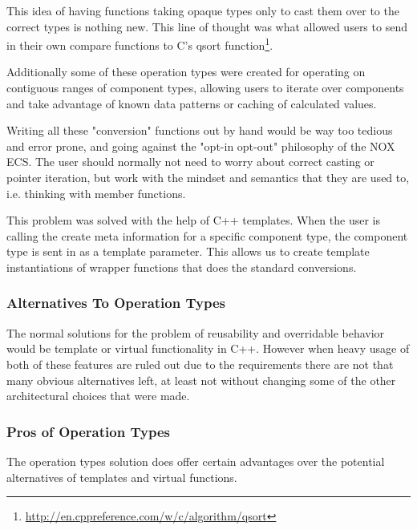 This idea of having functions taking opaque types only to cast them over to the correct types is nothing new.
This line of thought was what allowed users to send in their own compare functions to C's qsort function\footnote{\url{http://en.cppreference.com/w/c/algorithm/qsort}}.

Additionally some of these operation types were created for operating on contiguous ranges of component types,
allowing users to iterate over components and take advantage of known data patterns or caching of calculated values.

Writing all these "conversion" functions out by hand would be way too tedious and error prone,
and going against the "opt-in opt-out" philosophy of the NOX ECS.
The user should normally not need to worry about correct casting or pointer iteration,
but work with the mindset and semantics that they are used to, i.e. thinking with member functions.

This problem was solved with the help of C++ templates. 
When the user is calling the create meta information for a specific component type,
the component type is sent in as a template parameter.
This allows us to create template instantiations of wrapper functions that does the standard conversions.

\subsubsection{Alternatives To Operation Types}
The normal solutions for the problem of reusability and overridable behavior would be template or virtual
functionality in C++. However when heavy usage of both of these features are ruled out due to the requirements there are not that many obvious alternatives left,
at least not without changing some of the other architectural choices that were made.

\subsubsection{Pros of Operation Types}
The operation types solution does offer certain advantages over the potential alternatives of templates and virtual functions.

